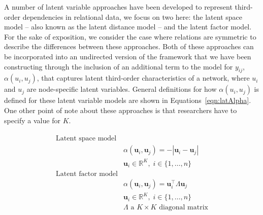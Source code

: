 \documentclass[9pt,twocolumn,twoside,lineno]{pnas-new}
\begin{document}
A number of latent variable approaches have been developed to represent third-order dependencies in relational data, we focus on two here: the latent space model -- also known as the latent distance model -- and the latent factor model. For the sake of exposition, we consider the case where relations are symmetric to describe the differences between these approaches. Both of these approaches can be incorporated into an undirected version of the framework that we have been constructing through the inclusion of an additional term to the model for $y_{ij}$, $\alpha(u_{i}, u_{j})$, that captures latent third-order characteristics of a network, where $u_{i}$ and $u_{j}$ are node-specific latent variables. General definitions for how $\alpha(u_{i}, u_{j})$ is defined for these latent variable models are shown in Equations~\ref{eqn:latAlpha}. One other point of note about these approaches is that researchers have to specify a value for $K$.

\begin{align}
\begin{aligned}
\text{Latent space model} \\
	&\alpha(\textbf{u}_{i}, \textbf{u}_{j}) = -|\textbf{u}_{i} - \textbf{u}_{j}| \\
	&\textbf{u}_{i} \in \mathbb{R}^{K}, \; i \in \{1, \ldots, n \} \\
\text{Latent factor model} \\
	&\alpha(\textbf{u}_{i}, \textbf{u}_{j}) = \textbf{u}_{i}^{\top} \Lambda \textbf{u}_{j} \\
	&\textbf{u}_{i} \in \mathbb{R}^{K}, \; i \in \{1, \ldots, n \} \\
	&\Lambda \text{ a } K \times K \text{ diagonal matrix}
\label{eqn:latAlpha}
\end{aligned}
\end{align}
\end{document}
